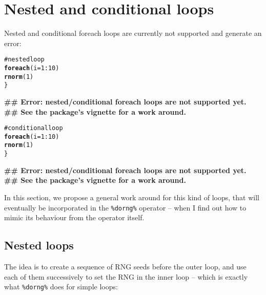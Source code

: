 \documentclass[a4paper,12pt]{article}\usepackage{graphicx, color}
\makeatletter
\newcommand{\hlfunctioncall}[1]{\textcolor[rgb]{0.501960784313725,0,0.329411764705882}{\textbf{#1}}}%
\newcommand{\hlcomment}[1]{\textcolor[rgb]{0.180392156862745,0.6,0.341176470588235}{#1}}%
\newenvironment{kframe}{%
 \def\at@end@of@kframe{}%
 \ifinner\ifhmode%
  \def\at@end@of@kframe{\end{minipage}}%
  \begin{minipage}{\columnwidth}%
 \fi\fi%
 \def\FrameCommand##1{\hskip\@totalleftmargin \hskip-\fboxsep
 \colorbox{shadecolor}{##1}\hskip-\fboxsep
     \hskip-\linewidth \hskip-\@totalleftmargin \hskip\columnwidth}%
 \MakeFramed {\advance\hsize-\width
   \@totalleftmargin\z@ \linewidth\hsize
   \@setminipage}}%
 {\par\unskip\endMakeFramed%
 \at@end@of@kframe}
\newenvironment{knitrout}{}{} %
\renewenvironment{knitrout}{\begin{footnotesize}}{\end{footnotesize}}
\let\code=\texttt
\makeatother
\begin{document}
\section{Nested and conditional loops}
\label{sec:nested}

Nested and conditional foreach loops are currently not supported and generate an error:

\begin{knitrout}
\color{fgcolor}\begin{kframe}
\begin{alltt}
\hlcomment{# nested loop}
\hlfunctioncall{foreach}(i = 1:10) %:% \hlfunctioncall{foreach}(j = 1:i) %dorng% \{
    \hlfunctioncall{rnorm}(1)
\}
\end{alltt}


{\ttfamily\noindent\bfseries\textcolor{errorcolor}{\#\# Error: nested/conditional foreach loops are not supported yet.\\\#\# See the package's vignette for a work around.}}\begin{alltt}

\hlcomment{# conditional loop}
\hlfunctioncall{foreach}(i = 1:10) %:% \hlfunctioncall{when}(i%%2 == 0) %dorng% \{
    \hlfunctioncall{rnorm}(1)
\}
\end{alltt}


{\ttfamily\noindent\bfseries\textcolor{errorcolor}{\#\# Error: nested/conditional foreach loops are not supported yet.\\\#\# See the package's vignette for a work around.}}\end{kframe}
\end{knitrout}


In this section, we propose a general work around for this kind of loops, that will 
eventually be incorporated in the \code{\%dorng\%} operator -- when I find out how to 
mimic its behaviour from the operator itself.

\subsection{Nested loops}

The idea is to create a sequence of RNG seeds before the outer loop, and use each 
of them successively to set the RNG in the inner loop -- which is exactly what \code{\%dorng\%} does 
for simple loops:
\end{document}
